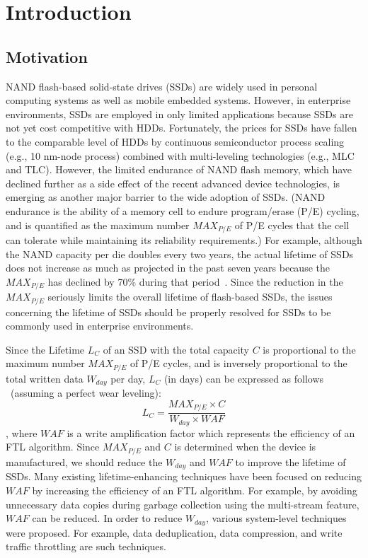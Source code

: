 
\chapter{Introduction} 
\label{chap:Introduction}

\section{Motivation}
\label{sec:Intro_Motivation}
NAND flash-based solid-state drives (SSDs) are widely used in personal computing
systems as well as mobile embedded systems. However, in enterprise environments,
SSDs are employed in only limited applications because SSDs are not yet cost 
competitive with HDDs. Fortunately, the prices for SSDs have fallen to the 
comparable level of HDDs by continuous semiconductor process scaling 
(e.g., 10 nm-node process) combined with multi-leveling technologies (e.g., 
MLC and TLC). However, the limited endurance of NAND flash memory, which have
declined further as a side effect of the recent advanced device technologies,
is emerging as another major barrier to the wide adoption of SSDs. (NAND endurance
is the ability of a memory cell to endure program/erase (P/E) cycling, and is
quantified as the maximum number $MAX_{P/E}$ of P/E cycles that the cell can tolerate
while maintaining its reliability requirements.) 
For example, although the NAND capacity per die doubles every two years, the 
actual lifetime of SSDs does not increase as much as projected in the past seven
years because the $MAX_{P/E}$ has declined by 70\% during that period~\cite{MooresLaw}.
Since the reduction in the $MAX_{P/E}$ seriously limits the overall lifetime of flash-based SSDs,
the issues concerning the lifetime of SSDs should be properly resolved for SSDs to be commonly 
used in enterprise environments.

Since the Lifetime $L_C$ of an SSD with the total capacity $C$ is proportional to 
the maximum number $MAX_{P/E}$ of P/E cycles, and is inversely proportional to the
total written data $W_{day}$ per day, $L_C$ (in days) can be expressed as follows
~\cite{DPES}(assuming a perfect wear leveling):
\[L_C = \frac{MAX_{P/E} \times C}{W_{day} \times WAF}\],
where $WAF$ is a write amplification factor which represents the efficiency of an FTL
algorithm. Since $MAX_{P/E}$ and $C$ is determined when the device is manufactured,
we should reduce the $W_{day}$ and $WAF$ to improve the lifetime of SSDs.
Many existing lifetime-enhancing techniques have been focused on reducing $WAF$
by increasing the efficiency of an FTL algorithm. For example, by avoiding
unnecessary data copies during garbage collection 
using the multi-stream feature, $WAF$ can be reduced.
In order to reduce $W_{day}$, various system-level techniques were proposed.
For example, data deduplication, data compression, and write traffic 
throttling are such techniques.

